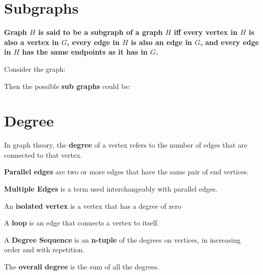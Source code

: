 \documentclass{report}
\begin{document}
    \section{\LARGE Subgraphs}
    \smallbreak \noindent
    \begin{definition}
    \textbf{ Graph $H$ is said to be a \textbf{subgraph} of a graph $H$ iff every vertex in $H$ is also a vertex in $G$, every edge in $H$ is also an edge in $G$, and every edge in $H$ has the same endpoints as it has in $G$.} 
    \bigbreak \noindent 
    \end{definition}
    \bigbreak \noindent 
    Consider the graph:
    \bigbreak \noindent 
    \begin{figure}[ht]
        \centering
        \label{fig:take45}
    \end{figure}
    \bigbreak \noindent 
    Then the possible \textbf{sub graphs} could be:
    \bigbreak \noindent 
    \begin{figure}[ht]
        \centering
        \label{fig:tryagain3}
    \end{figure}
    \bigbreak \noindent 

    \pagebreak \bigbreak \noindent 
    \section{\LARGE Degree}
    \bigbreak \noindent 
    \smallbreak \noindent
    \begin{definition}
    In graph theory, the \textbf{degree} of a vertex refers to the number of edges that are connected to that vertex. 
    \end{definition}
    \smallbreak \noindent
    \begin{definition}
        \textbf{Parallel edges} are two or more edges that have the same pair of end vertices. 
    \end{definition}
    \smallbreak \noindent
    \begin{definition}
         \textbf{Multiple Edges} is a term used interchangeably with parallel edges. 
    \end{definition}
    \smallbreak \noindent
    \begin{definition}
         An \textbf{isolated vertex} is a vertex that has a degree of zero
    \end{definition}
    \smallbreak \noindent
    \begin{definition}
         A \textbf{loop} is an edge that connects a vertex to itself. 
    \end{definition}
    \smallbreak \noindent
    \begin{definition}
         A \textbf{Degree Sequence} is an \textbf{n-tuple} of the degrees on vertices, in increasing order and with repetition. 
    \end{definition}
    \smallbreak \noindent
    \begin{definition}
         The \textbf{overall degree} is the sum of all the degrees.
    \end{definition}
\end{document}
